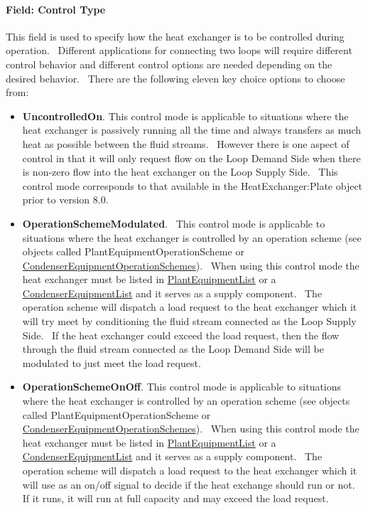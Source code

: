 \paragraph{Field: Control Type}\label{field-control-type}

This field is used to specify how the heat exchanger is to be controlled during operation.~ Different applications for connecting two loops will require different control behavior and different control options are needed depending on the desired behavior.~ There are the following eleven key choice options to choose from:

\begin{itemize}
\item
  \textbf{UncontrolledOn}. This control mode is applicable to situations where the heat exchanger is passively running all the time and always transfers as much heat as possible between the fluid streams.~ However there is one aspect of control in that it will only request flow on the Loop Demand Side when there is non-zero flow into the heat exchanger on the Loop Supply Side.~ This control mode corresponds to that available in the HeatExchanger:Plate object prior to version 8.0.
\item
  \textbf{OperationSchemeModulated}.~ This control mode is applicable to situations where the heat exchanger is controlled by an operation scheme (see objects called PlantEquipmentOperationScheme or \hyperref[condenserequipmentoperationschemes]{CondenserEquipmentOperationSchemes}).~ When using this control mode the heat exchanger must be listed in \hyperref[plantequipmentlist]{PlantEquipmentList} or a \hyperref[condenserequipmentlist]{CondenserEquipmentList} and it serves as a supply component.~ The operation scheme will dispatch a load request to the heat exchanger which it will try meet by conditioning the fluid stream connected as the Loop Supply Side.~ If the heat exchanger could exceed the load request, then the flow through the fluid stream connected as the Loop Demand Side will be modulated to just meet the load request.
\item
  \textbf{OperationSchemeOnOff}. This control mode is applicable to situations where the heat exchanger is controlled by an operation scheme (see objects called PlantEquipmentOperationScheme or \hyperref[condenserequipmentoperationschemes]{CondenserEquipmentOperationSchemes}).~ When using this control mode the heat exchanger must be listed in \hyperref[plantequipmentlist]{PlantEquipmentList} or a \hyperref[condenserequipmentlist]{CondenserEquipmentList} and it serves as a supply component.~ The operation scheme will dispatch a load request to the heat exchanger which it will use as an on/off signal to decide if the heat exchange should run or not.~ If it runs, it will run at full capacity and may exceed the load request.

\end{itemize}
